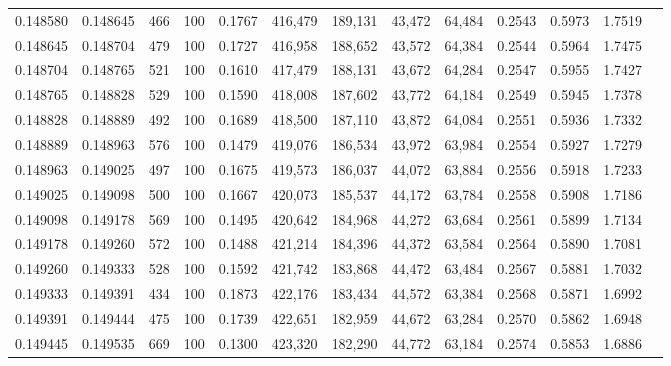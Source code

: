\begin{tabular}{rrrrrrrrrrrrr}
0.148580 & 0.148645 &   466 & 100 &                                     0.1767 & 416,479 & 189,131 &  43,472 &  64,484 & 0.2543 & 0.5973 & 1.7519 \\
0.148645 & 0.148704 &   479 & 100 &                                     0.1727 & 416,958 & 188,652 &  43,572 &  64,384 & 0.2544 & 0.5964 & 1.7475 \\
0.148704 & 0.148765 &   521 & 100 &                                     0.1610 & 417,479 & 188,131 &  43,672 &  64,284 & 0.2547 & 0.5955 & 1.7427 \\
0.148765 & 0.148828 &   529 & 100 &                                     0.1590 & 418,008 & 187,602 &  43,772 &  64,184 & 0.2549 & 0.5945 & 1.7378 \\
0.148828 & 0.148889 &   492 & 100 &                                     0.1689 & 418,500 & 187,110 &  43,872 &  64,084 & 0.2551 & 0.5936 & 1.7332 \\
0.148889 & 0.148963 &   576 & 100 &                                     0.1479 & 419,076 & 186,534 &  43,972 &  63,984 & 0.2554 & 0.5927 & 1.7279 \\
0.148963 & 0.149025 &   497 & 100 &                                     0.1675 & 419,573 & 186,037 &  44,072 &  63,884 & 0.2556 & 0.5918 & 1.7233 \\
0.149025 & 0.149098 &   500 & 100 &                                     0.1667 & 420,073 & 185,537 &  44,172 &  63,784 & 0.2558 & 0.5908 & 1.7186 \\
0.149098 & 0.149178 &   569 & 100 &                                     0.1495 & 420,642 & 184,968 &  44,272 &  63,684 & 0.2561 & 0.5899 & 1.7134 \\
0.149178 & 0.149260 &   572 & 100 &                                     0.1488 & 421,214 & 184,396 &  44,372 &  63,584 & 0.2564 & 0.5890 & 1.7081 \\
0.149260 & 0.149333 &   528 & 100 &                                     0.1592 & 421,742 & 183,868 &  44,472 &  63,484 & 0.2567 & 0.5881 & 1.7032 \\
0.149333 & 0.149391 &   434 & 100 &                                     0.1873 & 422,176 & 183,434 &  44,572 &  63,384 & 0.2568 & 0.5871 & 1.6992 \\
0.149391 & 0.149444 &   475 & 100 &                                     0.1739 & 422,651 & 182,959 &  44,672 &  63,284 & 0.2570 & 0.5862 & 1.6948 \\
0.149445 & 0.149535 &   669 & 100 &                                     0.1300 & 423,320 & 182,290 &  44,772 &  63,184 & 0.2574 & 0.5853 & 1.6886 \\

\end{tabular}
